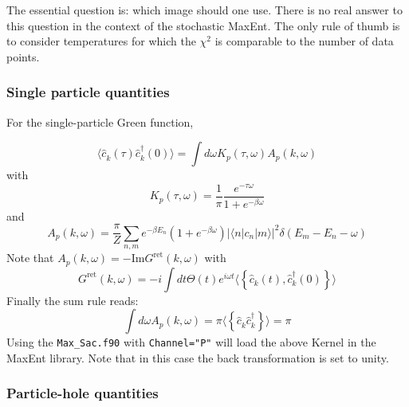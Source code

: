 The essential question is: which image should one use. There is no real answer to this question in the context of the stochastic MaxEnt. The only rule of thumb is to consider temperatures for which the \( \chi^2 \) is  comparable to the number of data points.


\subsubsection{Single particle quantities}
For the single-particle Green function, 

\begin{equation} 
	\langle \hat{c}^{\phantom\dagger}_{k} (\tau)  \hat{c}^{\dagger}_{k} (0)   \rangle   = \int d \omega  K_p(\tau,\omega)   A_p(k, \omega) 
\end{equation}
with 
\begin{equation}
K_{p}(\tau,\omega) =    \frac{1}{\pi} \frac{e^{-\tau \omega} }  {  1 + e^{-\beta\omega} }
\end{equation}
and 
\begin{equation}
   A_p(k, \omega) = \frac{ \pi}{Z} \sum_{n,m} e^{-\beta E_n } \left( 1 + e^{-\beta \omega}\right) | \langle n | c_n | m  \rangle |^{2} \delta \left( E_m - E_n - \omega \right)  
\end{equation}  
Note that  $ A_p(k, \omega)  = - \text{Im} G^{\text{ret}} (k, \omega) $ with 
\begin{equation}
	G^{\text{ret}} (k, \omega)  = -i \int d t \Theta(t)  e^{i \omega t} \langle \left\{ \hat{c}^{\phantom\dagger}_{k} (t), \hat{c}^{\dagger}_{k} (0) \right\} \rangle
\end{equation}
Finally the sum rule reads:
\begin{equation}
	\int d \omega  A_p(k, \omega)  = \pi \langle  \left\{ \hat{c}^{\phantom\dagger}_{k} \hat{c}^{\dagger}_{k}  \right\}   \rangle = \pi 
\end{equation}
Using the \texttt{Max\_Sac.f90}  with \texttt{Channel="P"}   will  load the above Kernel in the MaxEnt library.  Note that in this case the back  transformation is set to unity. 
\subsubsection{Particle-hole quantities }

